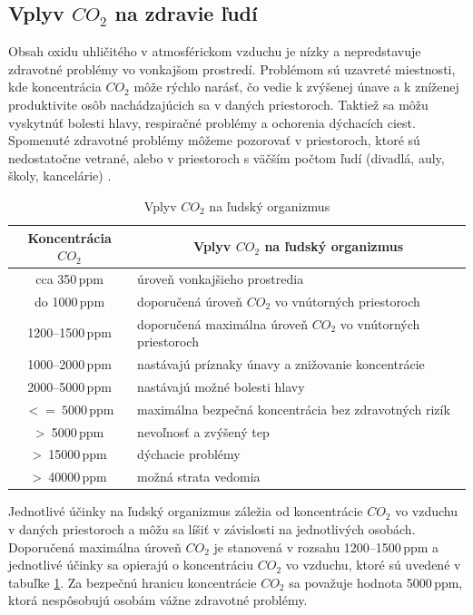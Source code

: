 \subsection{Vplyv $CO_2$ na zdravie ľudí}
Obsah oxidu uhličitého v atmosférickom vzduchu je nízky a nepredstavuje zdravotné problémy vo vonkajšom prostredí. Problémom sú uzavreté miestnosti, kde koncentrácia $CO_2$ môže rýchlo narásť, čo vedie k zvýšenej únave a k zníženej produktivite osôb nachádzajúcich sa v daných priestoroch. Taktiež sa môžu vyskytnúť bolesti hlavy, respiračné problémy a ochorenia dýchacích ciest. Spomenuté zdravotné problémy môžeme pozorovať v priestoroch, ktoré sú nedostatočne vetrané, alebo v priestoroch s väčším počtom ľudí (divadlá, auly, školy, kancelárie) \cite{VplyvOxiduUhlicitehoNaLudskyOrganizmus}.

\begin{table}[H]
\centering
\label{ucinkyCO2}
\begin{tabular}{|c|l|}
\hline
\textbf{Koncentrácia $CO_2$} & \multicolumn{1}{c|}{\textbf{Vplyv $CO_2$ na ľudský organizmus}} \\ \hline
cca 350\,ppm & úroveň vonkajšieho prostredia \\ \hline
do 1000\,ppm & doporučená úroveň $CO_2$ vo vnútorných priestoroch \\ \hline
1200--1500\,ppm & doporučená maximálna úroveň $CO_2$ vo vnútorných priestoroch \\ \hline
1000--2000\,ppm & nastávajú príznaky únavy a znižovanie koncentrácie \\ \hline
2000--5000\,ppm & nastávajú možné bolesti hlavy \\ \hline
$<= \ 5000$\,ppm & maximálna bezpečná koncentrácia bez zdravotných rizík \\ \hline
\textgreater \ 5000\,ppm & nevoľnosť a zvýšený tep \\ \hline
\textgreater \ 15000\,ppm & dýchacie problémy \\ \hline
\textgreater \ 40000\,ppm & možná strata vedomia \\ \hline
\end{tabular}
\caption{Vplyv $CO_2$ na ľudský organizmus \cite{VplyvOxiduUhlicitehoNaLudskyOrganizmus}}
\end{table}

Jednotlivé účinky na ľudský organizmus záležia od koncentrácie $CO_2$ vo vzduchu v daných priestoroch a môžu sa líšiť v závislosti na jednotlivých osobách. Doporučená maximálna úroveň $CO_2$ je stanovená v rozsahu 1200--1500\,ppm\cite{VyhlaskaKvalitaVnutornehoOvzdusiaCO} a jednotlivé účinky sa opierajú o koncentráciu $CO_2$ vo vzduchu, ktoré sú uvedené v tabuľke \ref{ucinkyCO2}. Za bezpečnú hranicu koncentrácie $CO_2$ sa považuje hodnota 5000\,ppm, ktorá nespôsobujú osobám vážne zdravotné problémy.

